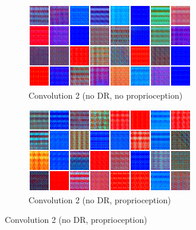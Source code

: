 \begin{figure}
  \begin{subfigure}{0.49\textwidth}
    \includegraphics[width=\textwidth]{figures/chapter6/act_max/fetch_nodr_noprop_conv2}
    \caption{Convolution 2 (no DR, no proprioception)}
  \end{subfigure}
  \begin{subfigure}{0.49\textwidth}
    \includegraphics[width=\textwidth]{figures/chapter6/act_max/fetch_nodr_prop_conv2}
    \caption{Convolution 2 (no DR, proprioception)}
  \end{subfigure}


\end{figure}
